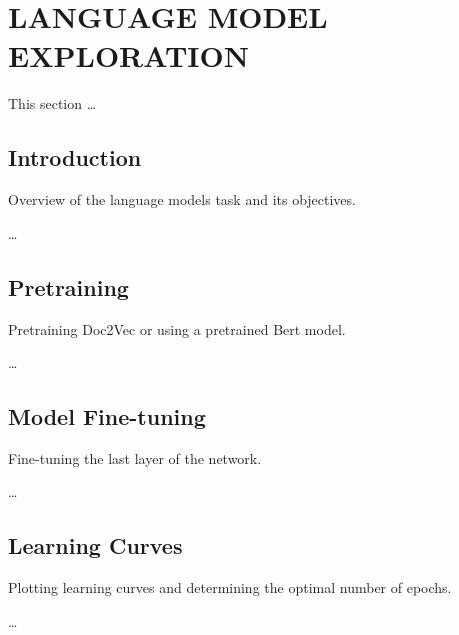 

\section{LANGUAGE MODEL EXPLORATION}

    This section \ldots

    \subsection{Introduction}
    
        Overview of the language models task and its objectives.

        \ldots

    \subsection{Pretraining}
    
        Pretraining Doc2Vec or using a pretrained Bert model.

        \ldots
        
    \subsection{Model Fine-tuning}
    
        Fine-tuning the last layer of the network.

        \ldots
        
    \subsection{Learning Curves}
    
        Plotting learning curves and determining the optimal number of epochs.

        \ldots
